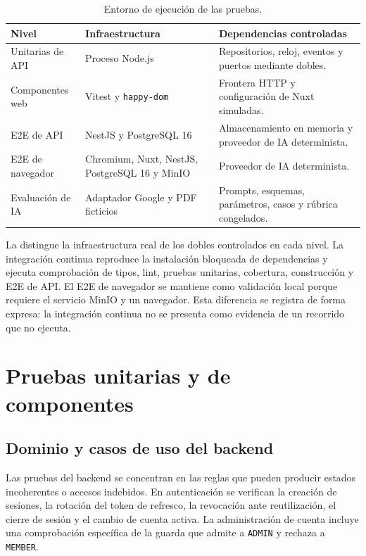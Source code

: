 \begin{table}[H]
  \centering
  \small
  \caption{Entorno de ejecución de las pruebas.}
  \label{tab:testing-environment}
  \begin{tabular}{@{}p{3.4cm}p{4.4cm}p{6cm}@{}}
    \toprule
    \textbf{Nivel} & \textbf{Infraestructura} & \textbf{Dependencias controladas} \\
    \midrule
    Unitarias de API & Proceso Node.js & Repositorios, reloj, eventos y puertos mediante dobles. \\
    Componentes web & Vitest y \texttt{happy-dom} & Frontera HTTP y configuración de Nuxt simuladas. \\
    E2E de API & NestJS y PostgreSQL 16 & Almacenamiento en memoria y proveedor de IA determinista. \\
    E2E de navegador & Chromium, Nuxt, NestJS, PostgreSQL 16 y MinIO & Proveedor de IA determinista. \\
    Evaluación de IA & Adaptador Google y PDF ficticios & Prompts, esquemas, parámetros, casos y rúbrica congelados. \\
    \bottomrule
  \end{tabular}
\end{table}

La  distingue la infraestructura real de los
dobles controlados en cada nivel. La integración continua reproduce la
instalación bloqueada de dependencias y
ejecuta comprobación de tipos, lint, pruebas unitarias, cobertura, construcción
y E2E de API. El E2E de navegador se mantiene como validación local porque
requiere el servicio MinIO y un navegador. Esta diferencia se registra de
forma expresa: la integración continua no se presenta como evidencia de un
recorrido que no ejecuta.

\section{Pruebas unitarias y de componentes}
\label{sec:unit-component-tests}

\subsection{Dominio y casos de uso del backend}

Las pruebas del backend se concentran en las reglas que pueden producir estados
incoherentes o accesos indebidos. En autenticación se verifican la creación de
sesiones, la rotación del token de refresco, la revocación ante reutilización,
el cierre de sesión y el cambio de cuenta activa. La administración de cuenta
incluye una comprobación específica de la guarda que admite a
\texttt{ADMIN} y rechaza a \texttt{MEMBER}.

